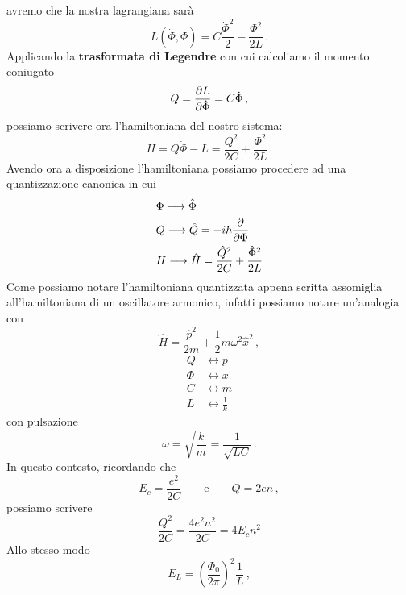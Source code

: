 avremo che la nostra lagrangiana sarà
\begin{equation*}
    L(\dot \Phi, \Phi) = C\frac{\dot{\Phi}^2}{2} - \frac{\Phi^2}{2L} \, .
\end{equation*}
Applicando la \textbf{trasformata di Legendre} con cui calcoliamo il momento coniugato
\begin{equation*}
    Q = \partialderivative{L}{\dot \Phi} = C\dot \Phi \, ,
\end{equation*}
possiamo scrivere ora l'hamiltoniana del nostro sistema:
\begin{equation*}
    H = Q\dot \Phi - L = \frac{Q^2}{2C} + \frac{\Phi^2}{2L} \, .
\end{equation*}
Avendo ora a disposizione l'hamiltoniana possiamo procedere ad una quantizzazione canonica in cui
\begin{align*}
    &\Phi \longrightarrow \hat \Phi \\
    &Q \longrightarrow \hat Q = -i\hbar \partialderivative{\Phi} \\
    &H \longrightarrow \hat H = \frac{\hat Q^2}{2C} + \frac{\hat \Phi^2}{2L}
\end{align*}
Come possiamo notare l'hamiltoniana quantizzata appena scritta assomiglia all'hamiltoniana di un oscillatore armonico, infatti possiamo notare un'analogia con
\begin{equation*}
    \hat H = \frac{\hat p^2}{2m} + \frac 12 m\omega^2\hat x^2 \, ,
\end{equation*}
\begin{align*}
    Q &\longleftrightarrow p \\
    \Phi &\longleftrightarrow x \\
    C &\longleftrightarrow m \\
    L &\longleftrightarrow \frac 1 k
\end{align*}
con pulsazione
\begin{equation*}
    \omega = \sqrt{\frac{k}{m}} = \frac{1}{\sqrt{LC}} \, .
\end{equation*}
In questo contesto, ricordando che
\begin{equation*}
    E_c = \frac{e^2}{2C} \qquad \text{e} \qquad Q = 2en \, ,
\end{equation*}
possiamo scrivere
\begin{equation*}
    \frac{Q^2}{2C} = \frac{4e^2n^2}{2C} = 4E_cn^2
\end{equation*}
Allo stesso modo
\begin{equation*}
    E_L = \left(\frac{\Phi_0}{2\pi}\right)^2\frac 1L \, ,
\end{equation*}
